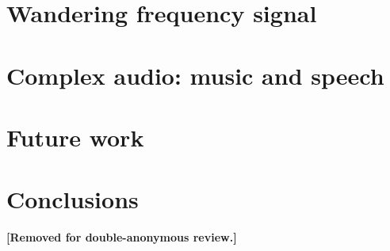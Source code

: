 \documentclass[aps,pra,superscriptaddress,reprint]{revtex4-1}
\begin{document}
 
\section{Wandering frequency signal}
\label{sec:viterbi_wandering}



\section{Complex audio: music and speech}
\label{sec:optical_microphone}



\section{Future work}
\label{sec:future_work}



\section{Conclusions}
\label{sec:conclusions}






\begin{acknowledgments}
\textbf{[Removed for double-anonymous review.]} 

\begin{comment}
The authors are grateful to Jude Prezens, Alex Tolotchkoc, and Blake Molyneux for their technical advice and generous assistance; Patrick Meyers, Margaret Millhouse, Sofia Suvorova for useful discussions; Patrick Clearwater, Patrick Meyers, Suk Yee Yong, Lucy Strang, Julian Carlin, Sanjaykumar Patil, and Alex Cameron for early work on the interferometer design requirements and construction; and the LIGO Education Public Outreach working group, in particular, Anna Green, Lynn Cominsky, and Sam Cooper, for their helpful feedback and suggestions.  
This research is supported by the Australian Research Council Centre of Excellence for Gravitational Wave Discovery (OzGrav) (project number CE170100004). 
Financial support towards hardware was provided by the Institute of Physics International Member Grant and the OzGrav Outreach Support scheme. 
Travel support was provided by the Australian National University PhB Science program.
This work has been assigned LIGO document number P2000386.
\end{comment}

\end{acknowledgments}


\appendix





\end{document}
